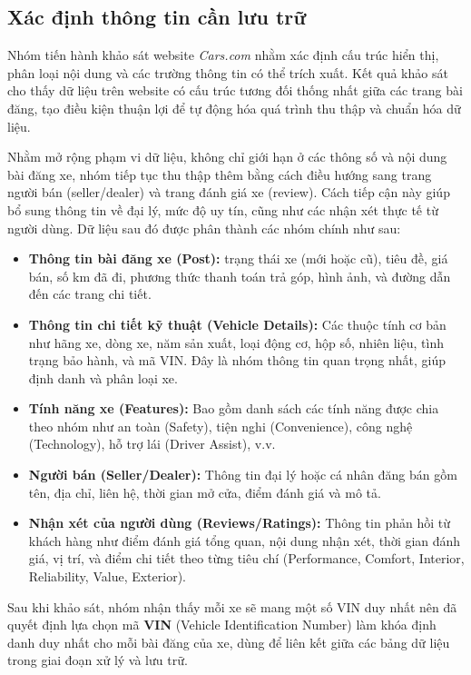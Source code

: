\subsection{Xác định thông tin cần lưu trữ}
Nhóm tiến hành khảo sát website \textit{Cars.com} nhằm xác định cấu trúc hiển thị, phân loại nội dung và các trường thông tin có thể trích xuất. Kết quả khảo sát cho thấy dữ liệu trên website có cấu trúc tương đối thống nhất giữa các trang bài đăng, tạo điều kiện thuận lợi để tự động hóa quá trình thu thập và chuẩn hóa dữ liệu.

Nhằm mở rộng phạm vi dữ liệu, không chỉ giới hạn ở các thông số và nội dung bài đăng xe, nhóm tiếp tục thu thập thêm bằng cách điều hướng sang trang người bán (seller/dealer) và trang đánh giá xe (review). Cách tiếp cận này giúp bổ sung thông tin về đại lý, mức độ uy tín, cũng như các nhận xét thực tế từ người dùng. Dữ liệu sau đó được phân thành các nhóm chính như sau:

\begin{itemize}
    \item \textbf{Thông tin bài đăng xe (Post):} trạng thái xe (mới hoặc cũ), tiêu đề, giá bán, số km đã đi, phương thức thanh toán trả góp, hình ảnh, và đường dẫn đến các trang chi tiết.
    \item \textbf{Thông tin chi tiết kỹ thuật (Vehicle Details):} Các thuộc tính cơ bản như hãng xe, dòng xe, năm sản xuất, loại động cơ, hộp số, nhiên liệu, tình trạng bảo hành, và mã VIN. Đây là nhóm thông tin quan trọng nhất, giúp định danh và phân loại xe.
    \item \textbf{Tính năng xe (Features):} Bao gồm danh sách các tính năng được chia theo nhóm như an toàn (Safety), tiện nghi (Convenience), công nghệ (Technology), hỗ trợ lái (Driver Assist), v.v.
    \item \textbf{Người bán (Seller/Dealer):} Thông tin đại lý hoặc cá nhân đăng bán gồm tên, địa chỉ, liên hệ, thời gian mở cửa, điểm đánh giá và mô tả.
    \item \textbf{Nhận xét của người dùng (Reviews/Ratings):} Thông tin phản hồi từ khách hàng như điểm đánh giá tổng quan, nội dung nhận xét, thời gian đánh giá, vị trí, và điểm chi tiết theo từng tiêu chí (Performance, Comfort, Interior, Reliability, Value, Exterior).
\end{itemize}

Sau khi khảo sát, nhóm nhận thấy mỗi xe sẽ mang một số VIN duy nhất nên đã quyết định lựa chọn mã \textbf{VIN} (Vehicle Identification Number) làm khóa định danh duy nhất cho mỗi bài đăng của xe, dùng để liên kết giữa các bảng dữ liệu trong giai đoạn xử lý và lưu trữ.

